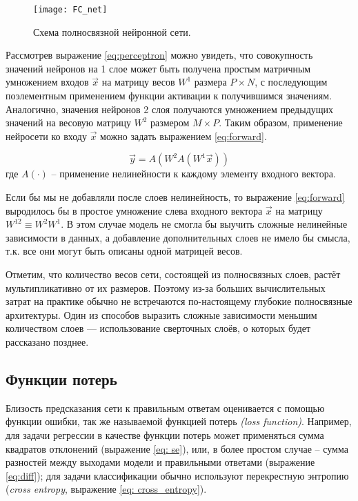 \begin{figure}[h!]
    \begin{center}
   	    \texttt{[image: FC\_net]}
   	\end{center}
   	\caption{Схема полносвязной нейронной сети.}
   	\label{tikzpicture: fc_net}
\end{figure}

Рассмотрев выражение \ref{eq:perceptron} можно увидеть, что 
совокупность значений нейронов на 1 слое может быть получена 
простым матричным умножением входов $\vec{x}$ на матрицу весов
 $W^1$ размера $P \times N$, с последующим поэлементным применением 
функции активации к получившимся значениям. Аналогично, значения нейронов
2 слоя получаются умножением предыдущих значений на весовую матрицу
$W^2$ размером $M \times P$. Таким образом, применение нейросети
ко входу $\vec{x}$ можно задать выражением \ref{eq:forward}.

\begin{equation}\label{eq:forward}
	   \vec{y} = A(W^{2} A(W^{1} \vec{x}))
\end{equation}
где $A(\cdot)$ -- применение нелинейности к каждому элементу входного 
вектора.

\indent
\indent
Если бы мы не добавляли после слоев нелинейность, то выражение \ref{eq:forward}
выродилось бы в простое умножение слева входного вектора $\vec{x}$ на матрицу
$W^{12} \equiv W^{2} W^{1}$. В этом случае модель не смогла бы выучить 
сложные нелинейные зависимости в данных, а добавление дополнительных слоев
не имело бы смысла, т.к. все они могут быть описаны одной матрицей весов.

\indent
\indent
Отметим, что количество весов сети, состоящей из полносвязных слоев, растёт
мультипликативно от их размеров. Поэтому из-за больших вычислительных затрат
 на практике обычно не встречаются по-настоящему глубокие полносвязные архитектуры.
 Один из способов выразить сложные зависимости меньшим количеством слоев ---
 использование сверточных слоёв, о которых будет рассказано позднее.


\subsection{Функции потерь}
\label{section: losses}

\indent
\indent
Близость предсказания сети к правильным ответам оценивается
с помощью функции ошибки, так же называемой 
 функцией потерь \textit{(loss function)}. 
Например, для задачи регрессии в качестве функции потерь
может применяться сумма квадратов отклонений
 (выражение \ref{eq: se}),
 или, в более простом случае -- сумма разностей между выходами модели
  и правильными ответами (выражение \ref{eq:diff});
для задачи классификации обычно используют перекрестную энтропию 
(\textit{cross entropy}, выражение \ref{eq: cross_entropy}).


